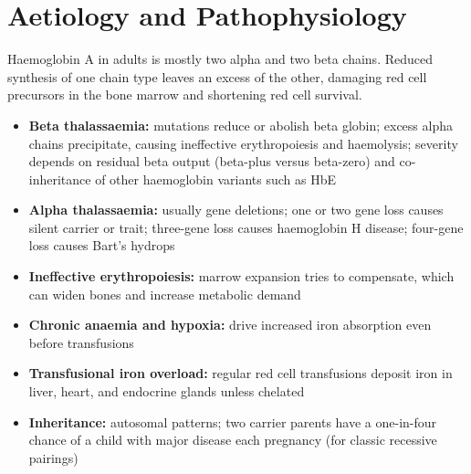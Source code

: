 \section*{Aetiology and Pathophysiology}
Haemoglobin A in adults is mostly two alpha and two beta chains. Reduced synthesis of one chain type leaves an excess of the other, damaging red cell precursors in the bone marrow and shortening red cell survival.

\begin{itemize}
    \item \textbf{Beta thalassaemia:} mutations reduce or abolish beta globin; excess alpha chains precipitate, causing ineffective erythropoiesis and haemolysis; severity depends on residual beta output (beta-plus versus beta-zero) and co-inheritance of other haemoglobin variants such as HbE
    \item \textbf{Alpha thalassaemia:} usually gene deletions; one or two gene loss causes silent carrier or trait; three-gene loss causes haemoglobin H disease; four-gene loss causes Bart's hydrops
    \item \textbf{Ineffective erythropoiesis:} marrow expansion tries to compensate, which can widen bones and increase metabolic demand
    \item \textbf{Chronic anaemia and hypoxia:} drive increased iron absorption even before transfusions
    \item \textbf{Transfusional iron overload:} regular red cell transfusions deposit iron in liver, heart, and endocrine glands unless chelated
    \item \textbf{Inheritance:} autosomal patterns; two carrier parents have a one-in-four chance of a child with major disease each pregnancy (for classic recessive pairings)
\end{itemize}

